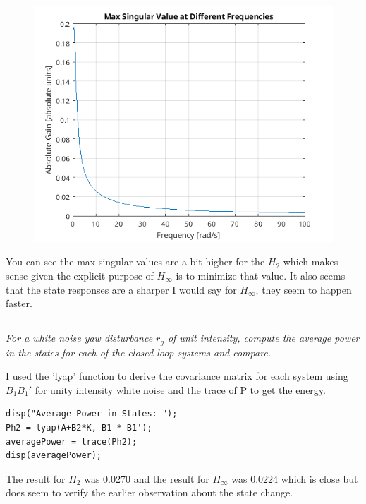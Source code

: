 \documentclass[12pt, letterpaper]{article}
\begin{document}
\begin{figure}[H]
    \centering
    \includegraphics{sigmaH2.png}
\end{figure}

You can see the max singular values are a bit higher for the $H_2$ which makes sense given the explicit purpose of $H_{\infty}$ is to minimize that value.
It also seems that the state responses are a sharper I would say for $H_{\infty}$, they seem to happen faster.

\subsection{}
\textit{
For a white noise yaw disturbance $r_g$ of unit intensity, compute the average power in the states for each of the closed loop systems and compare.
}

I used the 'lyap' function to derive the covariance matrix for each system using $B_1B_1'$ for unity intensity white noise and the trace of P to get the energy.

\begin{lstlisting}
disp("Average Power in States: ");
Ph2 = lyap(A+B2*K, B1 * B1');
averagePower = trace(Ph2);
disp(averagePower);    
\end{lstlisting}

The result for $H_2$ was 0.0270 and the result for $H_{\infty}$ was 0.0224 which is close but does seem to verify the earlier observation about the state change.
\end{document}
